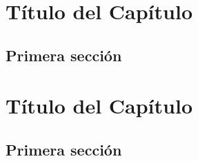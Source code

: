 \documentclass[12pt,a4paper,]{book}
\def\ifdoblecara{} %
\def\ifprincipal{} %
\numberwithin{dummy}{section}
\theoremstyle{ocrenumbox}
\theoremstyle{blacknumex}
\theoremstyle{blacknumbox}
\theoremstyle{ocrenum}
\theoremstyle{ocrenum}
\begin{document}
\FloatBarrier

\ifdefined\ifprincipal
\else
\setlength{\parindent}{1em}
\pagestyle{fancy}
\setcounter{tocdepth}{4}
\tableofcontents

\fi

\ifdefined\ifdoblecara
\fancyhead{}{}
\fancyhead[LE,RO]{\scriptsize\rightmark}
\fancyfoot[LO,RE]{\scriptsize\slshape \leftmark}
\fancyfoot[C]{}
\fancyfoot[LE,RO]{\footnotesize\thepage}
\else
\fancyhead{}{}
\fancyhead[RO]{\scriptsize\rightmark}
\fancyfoot[LO]{\scriptsize\slshape \leftmark}
\fancyfoot[C]{}
\fancyfoot[RO]{\footnotesize\thepage}
\fi
\renewcommand{\headrulewidth}{0.4pt}
\renewcommand{\footrulewidth}{0.4pt}

\hypertarget{tuxedtulo-del-capuxedtulo-2}{%
\chapter{Título del Capítulo}\label{tuxedtulo-del-capuxedtulo-2}}

\hypertarget{primera-secciuxf3n-2}{%
\section{Primera sección}\label{primera-secciuxf3n-2}}

\FloatBarrier

\ifdefined\ifprincipal
\else
\setlength{\parindent}{1em}
\pagestyle{fancy}
\setcounter{tocdepth}{4}
\tableofcontents

\fi

\ifdefined\ifdoblecara
\fancyhead{}{}
\fancyhead[LE,RO]{\scriptsize\rightmark}
\fancyfoot[LO,RE]{\scriptsize\slshape \leftmark}
\fancyfoot[C]{}
\fancyfoot[LE,RO]{\footnotesize\thepage}
\else
\fancyhead{}{}
\fancyhead[RO]{\scriptsize\rightmark}
\fancyfoot[LO]{\scriptsize\slshape \leftmark}
\fancyfoot[C]{}
\fancyfoot[RO]{\footnotesize\thepage}
\fi
\renewcommand{\headrulewidth}{0.4pt}
\renewcommand{\footrulewidth}{0.4pt}

\hypertarget{tuxedtulo-del-capuxedtulo-3}{%
\chapter{Título del Capítulo}\label{tuxedtulo-del-capuxedtulo-3}}

\hypertarget{primera-secciuxf3n-3}{%
\section{Primera sección}\label{primera-secciuxf3n-3}}
\end{document}
